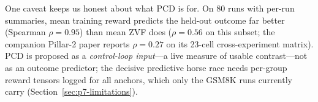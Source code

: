 One caveat keeps us honest about what PCD is for. On $80$ runs with
per-run summaries, mean training reward predicts the held-out outcome far
better (Spearman $\rho = 0.95$) than mean ZVF does ($\rho = 0.56$ on this
subset; the companion Pillar-2 paper reports $\rho = 0.27$ on its 23-cell
cross-experiment matrix). PCD is proposed
as a \emph{control-loop input}---a live measure of usable contrast---not as
an outcome predictor; the decisive predictive horse race needs per-group
reward tensors logged for all anchors, which only the GSM8K runs currently
carry (Section~\ref{sec:p7-limitations}).
